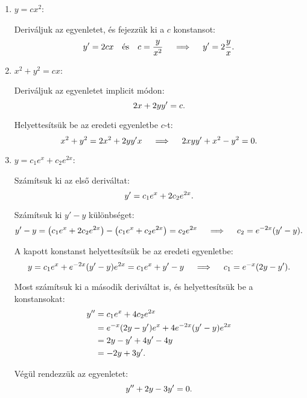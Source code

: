 \documentclass{szb-solution}
\begin{document}
\begin{enumerate}
  \item $y = c x^2$:

        Deriváljuk az egyenletet, és fejezzük ki a $c$ konstansot:
        $$
          y' = 2cx
          \quad \text{és} \quad
          c = \frac{y}{x^2}
          \quad \implies \quad
          y' = 2 \frac{y}{x}
          \text.
        $$


  \item $x^2 + y^2 = cx$:

        Deriváljuk az egyenletet implicit módon:
        $$
          2x + 2yy' = c
          \text.
        $$

        Helyettesítsük be az eredeti egyenletbe $c$-t:
        $$
          x^2 + y^2 = 2x^2 + 2yy'x
          \quad \implies \quad
          2xyy' + x^2 - y^2 = 0
          \text.
        $$

  \item $y = c_1 e^x + c_2 e^{2x}$:

        Számítsuk ki az első deriváltat:
        $$
          y'  = c_1 e^x + 2c_2 e^{2x} \text.
        $$

        Számítsuk ki $y' - y$ különbséget:
        $$
          y' - y
          = \left( c_1 e^x + 2c_2 e^{2x} \right) - \left( c_1 e^x + c_2 e^{2x} \right)
          = c_2 e^{2x}
          \quad \implies \quad
          c_2 = e^{-2x} (y' - y)
          \text.
        $$

        A kapott konstanst helyettesítsük be az eredeti egyenletbe:
        $$
          y
          = c_1 e^x + e^{-2x} (y' - y) e^{2x}
          = c_1 e^x + y' - y
          \quad \implies \quad
          c_1 = e^{-x} (2y - y')
          \text.
        $$

        Most számítsuk ki a második deriváltat is, és helyettesítsük be
        a konstansokat:
        \begin{align*}
          y''
           & = c_1 e^x + 4c_2 e^{2x}                            \\
           & = e^{-x} (2y - y') e^x + 4 e^{-2x} (y' - y) e^{2x} \\
           & = 2y - y' + 4y' - 4y                               \\
           & = -2y + 3y' \text.
        \end{align*}

        Végül rendezzük az egyenletet:
        $$
          y'' + 2y - 3y' = 0
          \text.
        $$
\end{enumerate}
\end{document}
